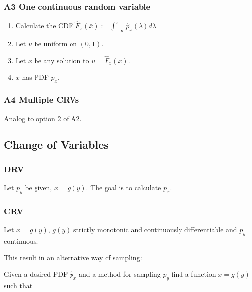 \documentclass[10pt,a4paper]{scrartcl}
\begin{document}
\begin{multicols*}{2}
\begin{multicols*}{3}
\subsubsection{A3 One continuous random variable}

\begin{enumerate}
\item Calculate the CDF $\hat{F}_x(\bar{x}):=\int_{-\infty}^{\bar{x}}\hat{p}_x(\lambda)d\lambda$
\item Let $u$ be uniform on $(0,1)$.
\item Let $\bar{x}$ be any solution to $\bar{u}=\hat{F}_x(\bar{x})$.
\item $x$ has PDF $\hat{p}_x$.
\end{enumerate}

\subsubsection{A4 Multiple CRVs}

Analog to option 2 of A2.

\subsection{Change of Variables}

\subsubsection{DRV}

Let $p_y$ be given, $x = g(y)$. The goal is to calculate $p_x$.


\subsubsection{CRV}

Let $x=g(y)$, $g(y)$ strictly monotonic and continuously differentiable and $p_y$ continuous.


This result in an alternative way of sampling:

Given a desired PDF $\hat{p}_x$ and a method for sampling $p_y$ find a function $x=g(y)$ such that



\end{multicols*}
\end{multicols*}
\end{document}

